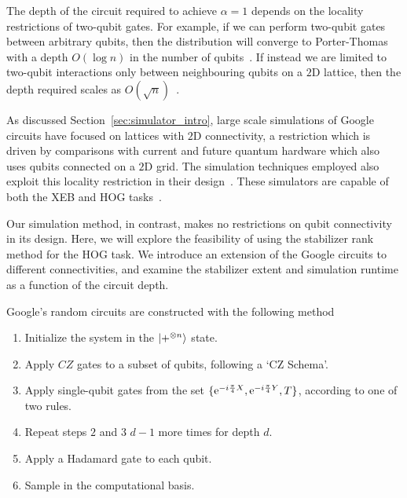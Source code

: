 The depth of the circuit required to achieve $\alpha=1$ depends on the locality restrictions of two-qubit gates. For example, if we can perform two-qubit gates between arbitrary qubits, then the distribution will converge to Porter-Thomas with a depth $O(\log{n})$ in the number of qubits~\cite{Emerson2098,Boixo2016}. If instead we are limited to two-qubit interactions only between neighbouring qubits on a $2$D lattice, then the depth required scales as $O(\sqrt{n})$~\cite{Harrow2018}.\par
As discussed Section~\ref{sec:simulator_intro}, large scale simulations of Google circuits have focused on lattices with $2$D connectivity, a restriction which is driven by comparisons with current and future quantum hardware which also uses qubits connected on a $2$D grid. The simulation techniques employed also exploit this locality restriction in their design~\cite{Pendault2017,Chen2018b,Markov2018,Villalonga2019}. These simulators are capable of both the XEB and HOG tasks~\cite{Villalonga2019}.\par
Our simulation method, in contrast, makes no restrictions on qubit connectivity in its design. Here, we will explore the feasibility of using the stabilizer rank method for the HOG task. We introduce an extension of the Google circuits to different connectivities, and examine the stabilizer extent and simulation runtime as a function of the circuit depth.\par
Google's random circuits are constructed with the following method
\begin{enumerate}
    \item Initialize the system in the $\ket{+^{\otimes n}}$ state.
    \item Apply $CZ$ gates to a subset of qubits, following a `CZ Schema'.
    \item Apply single-qubit gates from the set $\{\mathrm{e}^{-i\frac{\pi}{4}X},\mathrm{e}^{-i\frac{\pi}{4}Y},T\}$, according to one of two rules.
    \item Repeat steps $2$ and $3$ $d-1$ more times for depth $d$.
    \item Apply a Hadamard gate to each qubit.
    \item Sample in the computational basis.
\end{enumerate}
